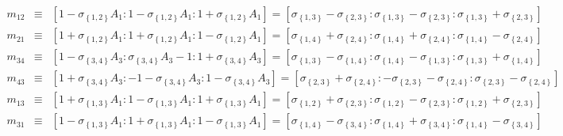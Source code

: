 \documentclass[11pt]{article}
\begin{document}
\begin{eqnarray*}
m_{12} &\equiv &\left[ 1-\sigma _{\left\{ 1,2\right\} }A_{1}:1-\sigma
_{\left\{ 1,2\right\} }A_{1}:1+\sigma _{\left\{ 1,2\right\} }A_{1}\right] =%
\left[ \sigma _{\left\{ 1,3\right\} }-\sigma _{\left\{ 2,3\right\} }:\sigma
_{\left\{ 1,3\right\} }-\sigma _{\left\{ 2,3\right\} }:\sigma _{\left\{
1,3\right\} }+\sigma _{\left\{ 2,3\right\} }\right]  \\
m_{21} &\equiv &\left[ 1+\sigma _{\left\{ 1,2\right\} }A_{1}:1+\sigma
_{\left\{ 1,2\right\} }A_{1}:1-\sigma _{\left\{ 1,2\right\} }A_{1}\right] =%
\left[ \sigma _{\left\{ 1,4\right\} }+\sigma _{\left\{ 2,4\right\} }:\sigma
_{\left\{ 1,4\right\} }+\sigma _{\left\{ 2,4\right\} }:\sigma _{\left\{
1,4\right\} }-\sigma _{\left\{ 2,4\right\} }\right]  \\
m_{34} &\equiv &\left[ 1-\sigma _{\left\{ 3,4\right\} }A_{3}:\sigma
_{\left\{ 3,4\right\} }A_{3}-1:1+\sigma _{\left\{ 3,4\right\} }A_{3}\right] =%
\left[ \sigma _{\left\{ 1,3\right\} }-\sigma _{\left\{ 1,4\right\} }:\sigma
_{\left\{ 1,4\right\} }-\sigma _{\left\{ 1,3\right\} }:\sigma _{\left\{
1,3\right\} }+\sigma _{\left\{ 1,4\right\} }\right]  \\
m_{43} &\equiv &\left[ 1+\sigma _{\left\{ 3,4\right\} }A_{3}:-1-\sigma
_{\left\{ 3,4\right\} }A_{3}:1-\sigma _{\left\{ 3,4\right\} }A_{3}\right] =%
\left[ \sigma _{\left\{ 2,3\right\} }+\sigma _{\left\{ 2,4\right\} }:-\sigma
_{\left\{ 2,3\right\} }-\sigma _{\left\{ 2,4\right\} }:\sigma _{\left\{
2,3\right\} }-\sigma _{\left\{ 2,4\right\} }\right]  \\
m_{13} &\equiv &\left[ 1+\sigma _{\left\{ 1,3\right\} }A_{1}:1-\sigma
_{\left\{ 1,3\right\} }A_{1}:1+\sigma _{\left\{ 1,3\right\} }A_{1}\right] =%
\left[ \sigma _{\left\{ 1,2\right\} }+\sigma _{\left\{ 2,3\right\} }:\sigma
_{\left\{ 1,2\right\} }-\sigma _{\left\{ 2,3\right\} }:\sigma _{\left\{
1,2\right\} }+\sigma _{\left\{ 2,3\right\} }\right]  \\
m_{31} &\equiv &\left[ 1-\sigma _{\left\{ 1,3\right\} }A_{1}:1+\sigma
_{\left\{ 1,3\right\} }A_{1}:1-\sigma _{\left\{ 1,3\right\} }A_{1}\right] =%
\left[ \sigma _{\left\{ 1,4\right\} }-\sigma _{\left\{ 3,4\right\} }:\sigma
_{\left\{ 1,4\right\} }+\sigma _{\left\{ 3,4\right\} }:\sigma _{\left\{
1,4\right\} }-\sigma _{\left\{ 3,4\right\} }\right] 
\end{eqnarray*}
\end{document}
